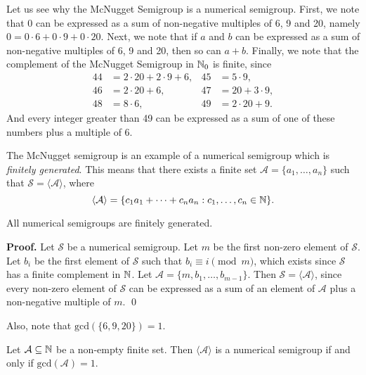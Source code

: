 Let us see why the McNugget Semigroup is a numerical semigroup. First, we note that $0$ can be expressed as a sum of non-negative multiples of 6, 9 and 20, namely $0 = 0 \cdot 6 + 0 \cdot 9 + 0 \cdot 20$. Next, we note that if $a$ and $b$ can be expressed as a sum of non-negative multiples of 6, 9 and 20, then so can $a + b$. Finally, we note that the complement of the McNugget Semigroup in $\mathbb{N}_0$ is finite, since 
\begin{align*}
    44 &= 2 \cdot 20 + 2 \cdot 9 + 6, &45 &= 5 \cdot 9,\\
    46 &= 2 \cdot 20 + 6, &47 &= 20 + 3 \cdot 9,\\
    48 &= 8 \cdot 6, & 49&= 2 \cdot 20 + 9. 
\end{align*}
And every integer greater than 49 can be expressed as a sum of one of these numbers plus a multiple of 6. \par
The McNugget semigroup is an example of a numerical semigroup which is \textit{finitely generated}. This means that there exists a finite set $\mathcal{A} = \{a_1, \ldots, a_n\}$ such that $\mathcal{S} = \langle \mathcal{A} \rangle$, where 
\[\langle \mathcal{A} \rangle = \{c_1a_1 + \cdots + c_na_n : c_1, \ldots, c_n \in \mathbb{N}\}.\]  
\begin{theorem}\label{thm:smgps:fin_gen}
    All numerical semigroups are finitely generated.
\end{theorem}

\textbf{Proof. } Let $\mathcal{S}$ be a numerical semigroup. Let $m$ be the first non-zero element of $\mathcal{S}$. Let $b_i$ be the first element of $\mathcal{S}$ such that \(b_i \equiv i \pmod m\), which exists since $\mathcal{S}$ has a finite complement in $\mathbb{N}$. Let $\mathcal{A} = \{m, b_{1}, \ldots, b_{m - 1}\}$. Then $\mathcal{S} = \langle \mathcal{A} \rangle$, since every non-zero element of $\mathcal{S}$ can be expressed as a sum of an element of $\mathcal{A}$ plus a non-negative multiple of $m$. \qed \par

Also, note that $\mathrm{gcd}(\{6, 9, 20\}) =  1$.

\begin{theorem}\label{thm:smgps:gcd}
    Let $\mathcal{A} \subseteq \mathbb{N}$ be a non-empty finite set. Then $\langle \mathcal{A} \rangle$ is a numerical semigroup if and only if $\mathrm{gcd}(\mathcal{A}) = 1$.    
\end{theorem}

